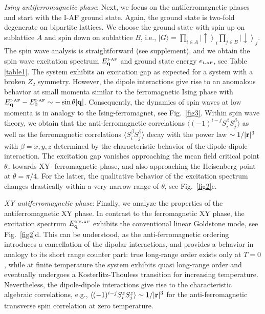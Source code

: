  
{\it Ising antiferromagnetic phase}: Next, we focus on the antiferromagnetic phases and start with the I-AF ground state.  
Again, the ground state is two-fold degenerate on bipartite lattices.  We choose the ground state with spin up on sublattice $A$
and spin down on sublattice $B$, i.e., $|G\rangle = \prod_{i \in A} \left|\uparrow\right\rangle_{i} \prod_{j\in B} \left|\downarrow\right\rangle_{j}$. 
The spin wave analysis is straightforward (see supplement), and we obtain
the spin wave excitation spectrum $ E^{\mbox{\tiny I-AF}}_{\bf q}$ and ground state energy $ e_{\mbox{\tiny I-AF}}$, see Table \ref{table1}.
The system exhibits an excitation gap as expected for a system with a broken $Z_{2}$ symmetry. 
However, the dipole interactions give rise to an anomalous behavior at small momenta similar to 
the ferromagnetic Ising phase with  $E^{\mbox{\tiny I-AF}}_{\bf q}- E^{\mbox{\tiny I-AF}}_{0} \sim -
\sin \theta |{\bf q}|$.  Consequently, the dynamics of spin waves at low momenta is in analogy to the 
Ising-ferromagnet,  see Fig.~\ref{fig3}.  Within spin wave theory, we obtain that the anti-ferromagnetic correlations  
$\langle (-1)^{i-j} S_{i}^{\beta}S_{j}^{\beta} \rangle$ 
as well as the ferromagnetic correlations  $\langle S_{i}^{\beta}S_{j}^{\beta} \rangle$ decay with the  
power law  $\sim1/ |{\bf r}|^{3}$ with $\beta = x,y,z$ determined by the characteristic behavior of the dipole-dipole interaction. 
The excitation gap vanishes approaching the mean field critical point $\theta_{c}$ towards XY- ferromagnetic 
phase, and also approaching the Heisenberg point at $\theta = \pi/4$. For the latter, the qualitative behavior of the excitation spectrum 
changes drastically within a very narrow range of $\theta$, see Fig.~\ref{fig2}c.



{\it XY antiferromagnetic phase}:  Finally, we analyze  the properties of the antiferromagnetic XY phase.
In contrast to the ferromagnetic XY phase, the excitation spectrum  $E^{\mbox{\tiny XY-AF}}_{\bf q}$ 
exhibits the conventional linear Goldstone mode, see Fig.~\ref{fig2}d. This can be understood, as the 
anti-ferromagnetic ordering introduces a cancellation of the dipolar interactions, and provides a behavior in analogy to
its short range counter part: true long-range order exists only at $T=0$, while at finite temperature the system
exhibits quasi long-range order and eventually undergoes a Kosterlitz-Thouless transition for increasing temperature.
Nevertheless, the dipole-dipole interactions give rise to the characteristic algebraic correlations, e.g., 
$\langle (-1)^{i-j}S_{i}^{z}S_{j}^{z} \rangle \sim 1/|{\bf r}|^3$ for the anti-ferromagnetic transverse spin correlation at zero temperature.



